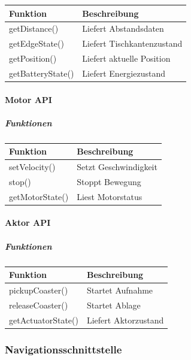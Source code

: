 \begin{longtable}[]{@{}ll@{}}
\toprule\noalign{}
Funktion & Beschreibung \\
\midrule\noalign{}
\endhead
\bottomrule\noalign{}
\endlastfoot
getDistance() & Liefert Abstandsdaten \\
getEdgeState() & Liefert Tischkantenzustand \\
getPosition() & Liefert aktuelle Position \\
getBatteryState() & Liefert Energiezustand \\
\end{longtable}

\paragraph{Motor API}\label{motor-api}

\subparagraph{Funktionen}\label{funktionen-6}

\begin{longtable}[]{@{}ll@{}}
\toprule\noalign{}
Funktion & Beschreibung \\
\midrule\noalign{}
\endhead
\bottomrule\noalign{}
\endlastfoot
setVelocity() & Setzt Geschwindigkeit \\
stop() & Stoppt Bewegung \\
getMotorState() & Liest Motorstatus \\
\end{longtable}

\paragraph{Aktor API}\label{aktor-api}

\subparagraph{Funktionen}\label{funktionen-7}

\begin{longtable}[]{@{}ll@{}}
\toprule\noalign{}
Funktion & Beschreibung \\
\midrule\noalign{}
\endhead
\bottomrule\noalign{}
\endlastfoot
pickupCoaster() & Startet Aufnahme \\
releaseCoaster() & Startet Ablage \\
getActuatorState() & Liefert Aktorzustand \\
\end{longtable}

\subsubsection{Navigationsschnittstelle}\label{navigationsschnittstelle}

